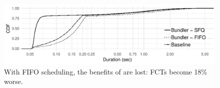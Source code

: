 \begin{figure}
    \centering
\begin{knitrout}
\color{fgcolor}
\includegraphics[width=\maxwidth]{figure/eval:fifo-1} 

\end{knitrout}
    \caption{With FIFO scheduling, the benefits of \name are lost: FCTs become 18\% worse.}
    \label{fig:eval:fifo}
\end{figure}
